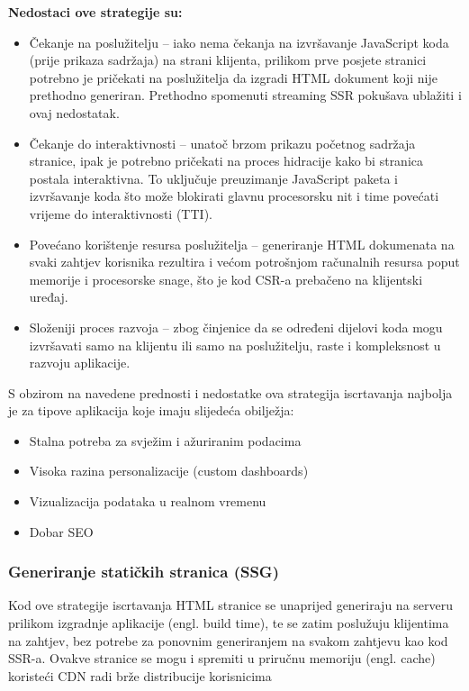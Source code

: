 \bigskip

\textbf{Nedostaci ove strategije su:}

\begin{itemize}
    \item Čekanje na poslužitelju – iako nema čekanja na izvršavanje JavaScript ko\-da (prije prikaza sadržaja) na strani klijenta, prilikom prve posjete stranici potrebno je pričekati na poslužitelja da izgradi HTML dokument koji nije prethodno generiran. Prethodno spomenuti streaming SSR pokušava ublažiti i ovaj nedostatak.
    \item Čekanje do interaktivnosti – unatoč brzom prikazu početnog sadržaja stranice, ipak je potrebno pričekati na proces hidracije kako bi stranica postala interaktivna. To uključuje preuzimanje JavaScript paketa i izvršavanje koda što može blokirati glavnu procesorsku nit i time povećati vrijeme do interaktivnosti (TTI).
    \item Povećano korištenje resursa poslužitelja – generiranje HTML dokumenata na svaki zahtjev korisnika rezultira i većom potrošnjom računalnih resursa poput memorije i procesorske snage, što je kod CSR-a prebačeno na klijentski uređaj.
    \item Složeniji proces razvoja – zbog činjenice da se određeni dijelovi koda mogu izvršavati samo na klijentu ili samo na poslužitelju, raste i kompleksnost u razvoju aplikacije. \cite{beran2023usporedba}
\end{itemize}

S obzirom na navedene prednosti i nedostatke ova strategija iscrtavanja najbolja je za tipove aplikacija koje imaju slijedeća obilježja:
\begin{itemize}
    \item Stalna potreba za svježim i ažuriranim podacima
    \item Visoka razina personalizacije (custom dashboards)
    \item Vizualizacija podataka u realnom vremenu
    \item Dobar SEO \cite{moore2024rendering}
\end{itemize}

\subsubsection{Generiranje statičkih stranica (SSG)}

Kod ove strategije iscrtavanja HTML stranice se unaprijed generiraju na serveru prilikom izgradnje aplikacije (engl. build time), te se zatim poslužuju klijentima na zahtjev, bez potrebe za ponovnim generiranjem na svakom zahtjevu kao kod SSR-a. Ovakve stranice se mogu i spremiti u priručnu memoriju (engl. cache) koristeći CDN radi brže distribucije korisnicima \cite{nextjsssg, sanityssg}

